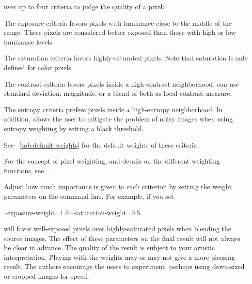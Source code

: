 \App{} uses up to four criteria to judge the quality of a pixel:

\begin{description}
\item[Exposure]\itemend
  The exposure criteria favors pixels with luminance close to the middle of the range.  These
  pixels are considered better exposed than those with high or low luminance levels.

\item[Saturation]\itemend
  The saturation criteria favors highly-saturated pixels.  Note that saturation is only defined
  for color pixels.

\item[Local Contrast]\itemend
  The contrast criteria favors pixels inside a high-contrast neighborhood.  \App{} can use
  standard deviation,  magnitude, or a blend of both as local contrast
  measure.

\item[Local Entropy]\itemend
  The entropy criteria prefers pixels inside a high-entropy neighborhood.  In addition, \App{}
  allows the user to mitigate the problem of noisy images when using entropy weighting by
  setting a black threshold.
\end{description}

\noindent See \tableName~\ref{tab:default-weights} for the default weights of these criteria.

For the concept of pixel weighting, and details on the different weighting functions, see
\chapterName~.

Adjust how much importance is given to each criterion by setting the weight parameters on the
command line.  For example, if you set
\begin{literal}
  --exposure-weight=1.0 --saturation-weight=0.5
\end{literal}
\App{} will favor well-exposed pixels over highly-saturated pixels when blending the source
images.  The effect of these parameters on the final result will not always be clear in advance.
The quality of the result is subject to your artistic interpretation.  Playing with the weights
may or may not give a more pleasing result.  The authors encourage the users to experiment,
perhaps using down-sized or cropped images for speed.

